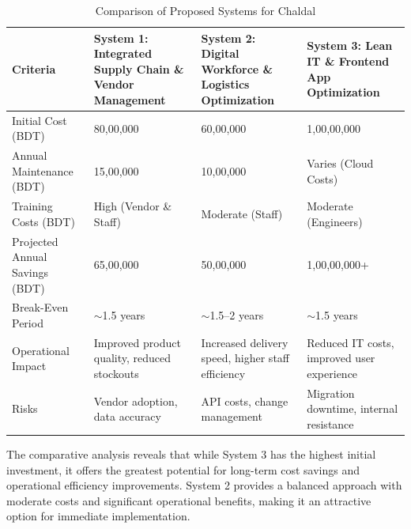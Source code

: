 \documentclass[12pt,a4paper]{article}
\begin{document}
\begin{table}[h]
\centering
\caption{Comparison of Proposed Systems for Chaldal}
\begin{tabular}{|p{3cm}|p{4cm}|p{4cm}|p{4cm}|}
\hline
\textbf{Criteria} & System 1: Integrated Supply Chain \& Vendor Management & System 2: Digital Workforce \& Logistics Optimization & System 3: Lean IT \& Frontend App Optimization \\ \hline

Initial Cost (BDT) & 80,00,000 & 60,00,000 & 1,00,00,000 \\ \hline

Annual Maintenance (BDT) & 15,00,000 & 10,00,000 & Varies (Cloud Costs) \\ \hline

Training Costs (BDT) & High (Vendor \& Staff) & Moderate (Staff) & Moderate (Engineers) \\ \hline

Projected Annual Savings (BDT) & 65,00,000 & 50,00,000 & 1,00,00,000+ \\ \hline

Break-Even Period & $\sim$1.5 years & $\sim$1.5--2 years & $\sim$1.5 years \\ \hline

Operational Impact & Improved product quality, reduced stockouts & Increased delivery speed, higher staff efficiency & Reduced IT costs, improved user experience \\ \hline

Risks & Vendor adoption, data accuracy & API costs, change management & Migration downtime, internal resistance \\ \hline
\end{tabular}
\end{table}

The comparative analysis reveals that while System 3 has the highest initial investment, it offers the greatest potential for long-term cost savings and operational efficiency improvements. System 2 provides a balanced approach with moderate costs and significant operational benefits, making it an attractive option for immediate implementation.
\end{document}
